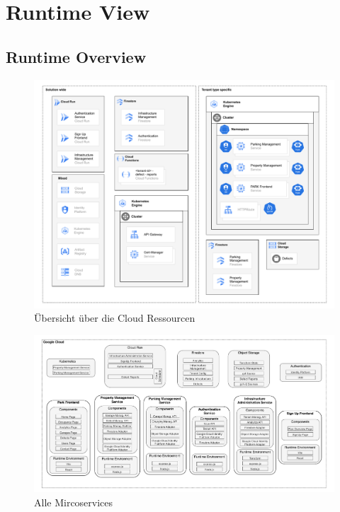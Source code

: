 \section{Runtime View}
\subsection{Runtime Overview}

\begin{figure}[ht]
  \centering
  \includegraphics[width=\textwidth]{resources/03-runtime-view/pdf/cloud-ressources.pdf}
  \caption{Übersicht über die Cloud Ressourcen}
  \label{fig:cloud-ressources}
\end{figure}

\begin{figure}[ht]
  \centering
  \includegraphics[width=\textwidth]{resources/03-runtime-view/pdf/architecture.pdf}
  \caption{Alle Mircoservices}
  \label{fig:system-architecture}
\end{figure}

